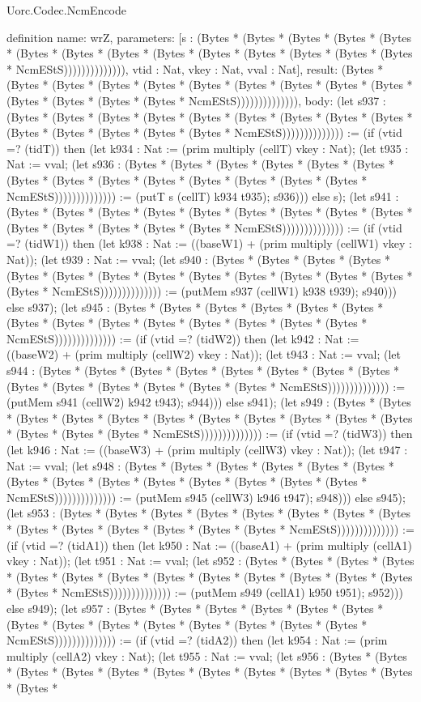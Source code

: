 \begin{lexlean}{Uorc.Codec.NcmEncode}
\begin{semanticmodule}
definition{
  name: wrZ,
  parameters: [s : (Bytes * (Bytes * (Bytes * (Bytes * (Bytes * (Bytes * (Bytes * (Bytes * (Bytes * (Bytes * (Bytes * (Bytes * (Bytes * (Bytes * NcmEStS)))))))))))))), vtid : Nat, vkey : Nat, vval : Nat],
  result: (Bytes * (Bytes * (Bytes * (Bytes * (Bytes * (Bytes * (Bytes * (Bytes * (Bytes * (Bytes * (Bytes * (Bytes * (Bytes * (Bytes * NcmEStS)))))))))))))),
  body: (let s937 : (Bytes * (Bytes * (Bytes * (Bytes * (Bytes * (Bytes * (Bytes * (Bytes * (Bytes * (Bytes * (Bytes * (Bytes * (Bytes * (Bytes * NcmEStS)))))))))))))) := (if (vtid =? (tidT)) then (let k934 : Nat := (prim multiply (cellT) vkey : Nat); (let t935 : Nat := vval; (let s936 : (Bytes * (Bytes * (Bytes * (Bytes * (Bytes * (Bytes * (Bytes * (Bytes * (Bytes * (Bytes * (Bytes * (Bytes * (Bytes * (Bytes * NcmEStS)))))))))))))) := (putT s (cellT) k934 t935); s936))) else s); (let s941 : (Bytes * (Bytes * (Bytes * (Bytes * (Bytes * (Bytes * (Bytes * (Bytes * (Bytes * (Bytes * (Bytes * (Bytes * (Bytes * (Bytes * NcmEStS)))))))))))))) := (if (vtid =? (tidW1)) then (let k938 : Nat := ((baseW1) + (prim multiply (cellW1) vkey : Nat)); (let t939 : Nat := vval; (let s940 : (Bytes * (Bytes * (Bytes * (Bytes * (Bytes * (Bytes * (Bytes * (Bytes * (Bytes * (Bytes * (Bytes * (Bytes * (Bytes * (Bytes * NcmEStS)))))))))))))) := (putMem s937 (cellW1) k938 t939); s940))) else s937); (let s945 : (Bytes * (Bytes * (Bytes * (Bytes * (Bytes * (Bytes * (Bytes * (Bytes * (Bytes * (Bytes * (Bytes * (Bytes * (Bytes * (Bytes * NcmEStS)))))))))))))) := (if (vtid =? (tidW2)) then (let k942 : Nat := ((baseW2) + (prim multiply (cellW2) vkey : Nat)); (let t943 : Nat := vval; (let s944 : (Bytes * (Bytes * (Bytes * (Bytes * (Bytes * (Bytes * (Bytes * (Bytes * (Bytes * (Bytes * (Bytes * (Bytes * (Bytes * (Bytes * NcmEStS)))))))))))))) := (putMem s941 (cellW2) k942 t943); s944))) else s941); (let s949 : (Bytes * (Bytes * (Bytes * (Bytes * (Bytes * (Bytes * (Bytes * (Bytes * (Bytes * (Bytes * (Bytes * (Bytes * (Bytes * (Bytes * NcmEStS)))))))))))))) := (if (vtid =? (tidW3)) then (let k946 : Nat := ((baseW3) + (prim multiply (cellW3) vkey : Nat)); (let t947 : Nat := vval; (let s948 : (Bytes * (Bytes * (Bytes * (Bytes * (Bytes * (Bytes * (Bytes * (Bytes * (Bytes * (Bytes * (Bytes * (Bytes * (Bytes * (Bytes * NcmEStS)))))))))))))) := (putMem s945 (cellW3) k946 t947); s948))) else s945); (let s953 : (Bytes * (Bytes * (Bytes * (Bytes * (Bytes * (Bytes * (Bytes * (Bytes * (Bytes * (Bytes * (Bytes * (Bytes * (Bytes * (Bytes * NcmEStS)))))))))))))) := (if (vtid =? (tidA1)) then (let k950 : Nat := ((baseA1) + (prim multiply (cellA1) vkey : Nat)); (let t951 : Nat := vval; (let s952 : (Bytes * (Bytes * (Bytes * (Bytes * (Bytes * (Bytes * (Bytes * (Bytes * (Bytes * (Bytes * (Bytes * (Bytes * (Bytes * (Bytes * NcmEStS)))))))))))))) := (putMem s949 (cellA1) k950 t951); s952))) else s949); (let s957 : (Bytes * (Bytes * (Bytes * (Bytes * (Bytes * (Bytes * (Bytes * (Bytes * (Bytes * (Bytes * (Bytes * (Bytes * (Bytes * (Bytes * NcmEStS)))))))))))))) := (if (vtid =? (tidA2)) then (let k954 : Nat := (prim multiply (cellA2) vkey : Nat); (let t955 : Nat := vval; (let s956 : (Bytes * (Bytes * (Bytes * (Bytes * (Bytes * (Bytes * (Bytes * (Bytes * (Bytes * (Bytes * (Bytes * (Bytes * }
\end{semanticmodule}
\end{lexlean}
